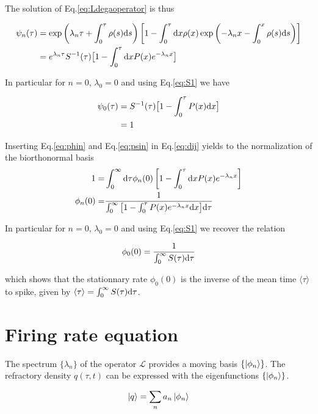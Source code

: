 \documentclass[12pt,twoside]{report}
\def \dd  {{\rm d}}
\begin{document}
The solution of Eq.\eqref{eq:Ldegaoperator} is thus

\begin{align}
\label{eq:psin}
\psi_n(\tau)&=\exp\left(\lambda_n\tau+\int_0^\tau\rho(s)\dd s\right)\left[1-\int^\tau_0\dd x \rho(x) \exp\left(-\lambda_nx-\int_0^x\rho(s)\dd s\right)\right]\nonumber\\
&=e^{\lambda_n\tau}S^{-1}(\tau)\big[1-\int^\tau_0 \dd x P(x) e^{-\lambda_nx}\big]
\end{align}

In particular for $n=0$, $\lambda_0=0$ and using Eq.\ref{eq:S1}  we have 

\begin{align}
\label{eq:psi0}
\psi_0(\tau)&=S^{-1}(\tau)\big[1-\int^\tau_0P(x) \dd x \big] \nonumber \\
&=1
\end{align}



 Inserting Eq.\eqref{eq:phin} and Eq.\eqref{eq:psin} in Eq.\eqref{eq:dij} yields to the normalization of the biorthonormal basis 
\begin{align}
1=&\int_0^{\infty}\dd \tau\phi_n(0)\left[1-\int^\tau_0 \dd x P(x) e^{-\lambda_nx}\right] \\
\phi_n(0) =&\frac{1}{\int_0^{\infty}\big[1-\int^\tau_0 P(x) e^{-\lambda_nx}\dd x\big]\dd\tau}
\end{align}


In particular for $n=0$, $\lambda_0=0$ and using Eq.\ref{eq:S1} we recover the relation

\begin{equation}
\phi_0(0) = \frac{1}{\int_0^{\infty}S(\tau)\dd\tau}
\end{equation}

which shows that the stationnary rate $\phi_0(0)$ is the inverse of the mean time $\langle\tau\rangle$ to spike, given by $\langle\tau\rangle=\int_0^{\infty}S(\tau)\dd\tau$.

\section{Firing rate equation}
\label{sec:emissionrateequation}

The spectrum $\{\lambda_n\}$ of the operator $\mathcal{L}$ provides a moving basis $ \{\ket{\phi_n}\}$. The refractory density $q(\tau,t)$ can be expressed with the eigenfunctions  $ \{\ket{\phi_n}\}$. 

\begin{equation}
\label{eq:q}
\ket{q}=\sum_na_n\ket{\phi_n}
\end{equation}
\end{document}
